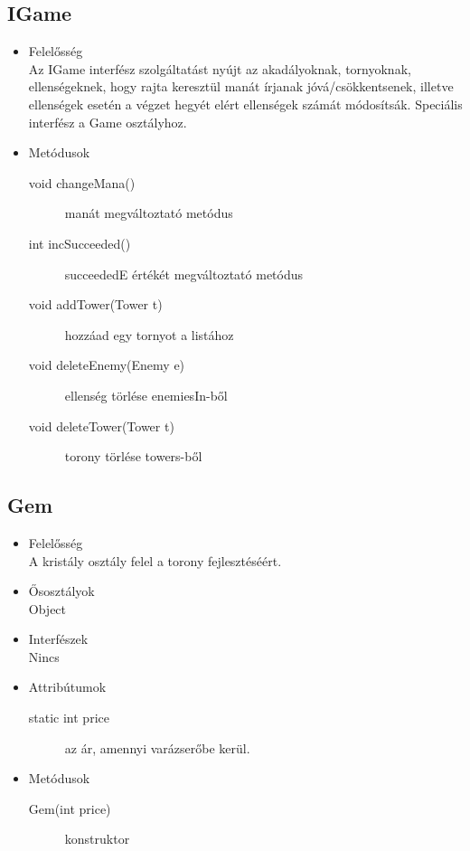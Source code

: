 \subsection{IGame}
\begin{itemize}
\item Felelősség\\
Az IGame interfész szolgáltatást nyújt az akadályoknak, tornyoknak, ellenségeknek, hogy rajta keresztül manát írjanak jóvá/csökkentsenek, illetve ellenségek esetén a végzet hegyét elért ellenségek számát módosítsák. Speciális interfész a Game osztályhoz. 

\item Metódusok\\
	\begin{description}
		\item[void changeMana()] manát megváltoztató metódus
\item[int incSucceeded()] succeededE értékét megváltoztató metódus
\item[void addTower(Tower t)] hozzáad egy tornyot a listához
\item[void deleteEnemy(Enemy e)] ellenség törlése enemiesIn-ből
\item[void deleteTower(Tower t)] torony törlése towers-ből

		
	\end{description}
\end{itemize}

\subsection{Gem}
\begin{itemize}
\item Felelősség\\
A kristály osztály felel a torony fejlesztéséért.
\item Ősosztályok\\
Object
\item Interfészek\\
Nincs
\item Attribútumok\\
	\begin{description}
		\item[static int price] az ár, amennyi varázserőbe kerül.
	\end{description}
\item Metódusok\\
	\begin{description}
		
		\item[Gem(int price)] konstruktor
		
		
	\end{description}
\end{itemize}

